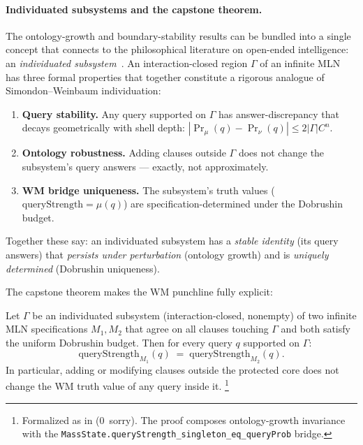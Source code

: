 \documentclass[11pt,openany]{report}
\begin{document}
\paragraph{Individuated subsystems and the capstone theorem.}
The ontology-growth and boundary-stability results can be bundled into a
single concept that connects to the philosophical literature on open-ended
intelligence: an \emph{individuated subsystem}~\cite{WeinbaumVeitas2015}.
An interaction-closed region $\Gamma$ of an infinite MLN has three formal
properties that together constitute a rigorous analogue of
Simondon--Weinbaum individuation:
\begin{enumerate}
\item \textbf{Query stability.}  Any query supported on $\Gamma$ has
  answer-discrepancy that decays geometrically with shell depth:
  $|\Pr_\mu(q) - \Pr_\nu(q)| \le 2|\Gamma|C^n$.
\item \textbf{Ontology robustness.}  Adding clauses outside $\Gamma$ does
  not change the subsystem's query answers --- exactly, not approximately.
\item \textbf{WM bridge uniqueness.}  The subsystem's truth values
  ($\mathrm{queryStrength} = \mu(q)$) are specification-determined under
  the Dobrushin budget.
\end{enumerate}
Together these say: an individuated subsystem has a \emph{stable identity}
(its query answers) that \emph{persists under perturbation} (ontology growth)
and is \emph{uniquely determined} (Dobrushin uniqueness).

The capstone theorem makes the WM punchline fully explicit:

\begin{theorem}
\label{thm:wm-ontology-stability}
Let $\Gamma$ be an individuated subsystem (interaction-closed, nonempty) of two
infinite MLN specifications $M_1, M_2$ that agree on all clauses touching
$\Gamma$ and both satisfy the uniform Dobrushin budget.  Then for every
query $q$ supported on $\Gamma$:
\[
  \mathrm{queryStrength}_{M_1}(q) \;=\; \mathrm{queryStrength}_{M_2}(q).
\]
In particular, adding or modifying clauses outside the protected core does not
change the WM truth value of any query inside it.%
\footnote{Formalized as
 in
(0~sorry).  The proof composes ontology-growth invariance with the
\texttt{MassState.queryStrength\_singleton\_eq\_queryProb} bridge.}
\end{theorem}
\end{document}
